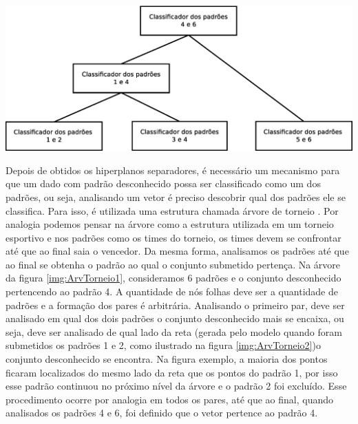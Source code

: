 \begin{center}
	\includegraphics[scale=0.4]{graficos/ArvTorneio2}
	\label{img:ArvTorneio2}
\end{center}
Depois de obtidos os hiperplanos separadores, é necessário um mecanismo para que um dado com padrão desconhecido possa ser classificado como um dos padrões, ou seja, analisando um vetor é preciso descobrir qual dos padrões ele se classifica. Para isso, é utilizada uma estrutura chamada árvore de torneio \cite{Feng} \cite{Guo}. Por analogia podemos pensar na árvore como a estrutura utilizada em um torneio esportivo e nos padrões como os times do torneio, os times devem se confrontar até que ao final saia o vencedor. Da mesma forma, analisamos os padrões até que ao final se obtenha o padrão ao qual o conjunto submetido pertença.
Na árvore da figura \ref{img:ArvTorneio1}, consideramos 6 padrões e o conjunto desconhecido pertencendo ao padrão 4. A quantidade de nós folhas deve ser a quantidade de padrões e a formação dos pares é arbitrária. Analisando o primeiro par, deve ser analisado em qual dos dois padrões o conjunto desconhecido mais se encaixa, ou seja, deve ser analisado de qual lado da reta (gerada pelo modelo quando foram submetidos os padrões 1 e 2, como ilustrado na figura \ref{img:ArvTorneio2})o conjunto desconhecido se encontra. Na figura exemplo, a maioria dos pontos ficaram localizados do mesmo lado da reta que os pontos do padrão 1, por isso esse padrão continuou no próximo nível da árvore e o padrão 2 foi excluído. Esse procedimento ocorre por analogia em todos os pares, até que ao final, quando analisados os padrões 4 e 6, foi definido que o vetor pertence ao padrão 4.
